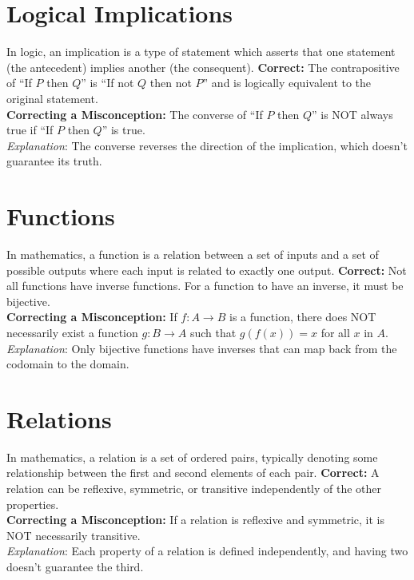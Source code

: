\documentclass[12pt]{article}
\newenvironment{correct}{\noindent\textbf{Correct:}}{\\}
\newenvironment{misconception}{\noindent\textbf{Correcting a Misconception:}}{\\}
\newenvironment{explanation}{\noindent\textit{Explanation}:}{\\\vspace{1em}}
\begin{document}
\section*{Logical Implications}
In logic, an implication is a type of statement which asserts that one statement (the antecedent) implies another (the consequent).
\begin{correct} The contrapositive of ``If \(P\) then \(Q\)'' is ``If not \(Q\) then not \(P\)'' and is logically equivalent to the original statement. \end{correct}
\begin{misconception} The converse of ``If \(P\) then \(Q\)'' is NOT always true if ``If \(P\) then \(Q\)'' is true. \end{misconception}
\begin{explanation} The converse reverses the direction of the implication, which doesn't guarantee its truth. \end{explanation}

\section*{Functions}
In mathematics, a function is a relation between a set of inputs and a set of possible outputs where each input is related to exactly one output.
\begin{correct} Not all functions have inverse functions. For a function to have an inverse, it must be bijective. \end{correct}
\begin{misconception} If \(f: A \rightarrow B\) is a function, there does NOT necessarily exist a function \(g: B \rightarrow A\) such that \(g(f(x)) = x\) for all \(x\) in \(A\). \end{misconception}
\begin{explanation} Only bijective functions have inverses that can map back from the codomain to the domain. \end{explanation}

\section*{Relations}
In mathematics, a relation is a set of ordered pairs, typically denoting some relationship between the first and second elements of each pair.
\begin{correct} A relation can be reflexive, symmetric, or transitive independently of the other properties. \end{correct}
\begin{misconception} If a relation is reflexive and symmetric, it is NOT necessarily transitive. \end{misconception}
\begin{explanation} Each property of a relation is defined independently, and having two doesn't guarantee the third. \end{explanation}
\end{document}
